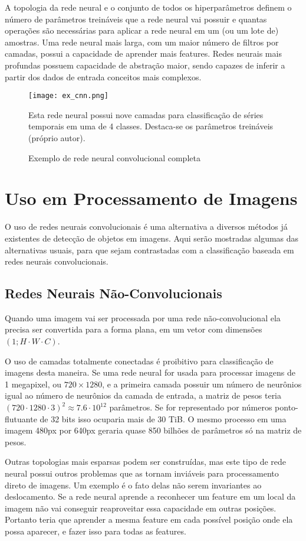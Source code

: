 A topologia da rede neural e o conjunto de todos os hiperparâmetros definem o
número de parâmetros treináveis que a rede neural vai possuir e quantas
operações são necessárias para aplicar a rede neural em um (ou um lote de)
amostras. Uma rede neural mais larga, com um maior número de filtros por
camadas, possui a capacidade de aprender mais features. Redes neurais mais
profundas possuem capacidade de abstração maior, sendo capazes de inferir a
partir dos dados de entrada conceitos mais complexos.

\begin{figure}[!htb]
	\centering
	\texttt{[image: ex\_cnn.png]}
	\caption{Exemplo de rede neural convolucional completa}
	\label{fig:ex_cnn}
	Esta rede neural possui nove camadas para
	classificação de séries temporais em uma de 4 classes. Destaca-se os
	parâmetros treináveis (próprio autor).
\end{figure}

\section{Uso em Processamento de Imagens}
O uso de redes neurais convolucionais é uma alternativa a diversos métodos já
existentes de detecção de objetos em imagens. Aqui serão mostradas algumas das
alternativas usuais, para que sejam contrastadas com a classificação baseada em
redes neurais convolucionais.

\subsection{Redes Neurais Não-Convolucionais}
Quando uma imagem vai ser processada por uma rede não-convolucional ela precisa
ser convertida para a forma plana, em um vetor com dimensões
$(1; H \cdot W \cdot C)$.

O uso de camadas totalmente conectadas é proibitivo para classificação de
imagens desta maneira. Se uma rede neural for usada para processar imagens de 1
megapixel, ou $720 \times 1280$, e a primeira camada possuir um
número de neurônios igual
ao número de neurônios da camada de entrada, a matriz de pesos teria
$(720 \cdot 1280 \cdot 3)^2 \approx 7.6 \cdot 10^{12}$ parâmetros. Se for
representado por números ponto-flutuante de 32 bits isso ocuparia mais de
30 TiB. O mesmo processo em uma imagem 480px por 640px geraria quase 850
bilhões de parâmetros só na matriz de pesos.

Outras topologias mais esparsas podem ser construídas, mas este tipo de rede
neural possui outros problemas que as tornam inviáveis para processamento direto
de imagens. Um exemplo é o fato delas não serem invariantes ao deslocamento. Se
a rede neural aprende a reconhecer um feature em um local da imagem não vai
conseguir reaproveitar essa capacidade em outras posições. Portanto teria que
aprender a mesma feature em cada possível posição onde ela possa aparecer, e
fazer isso para todas as features.

